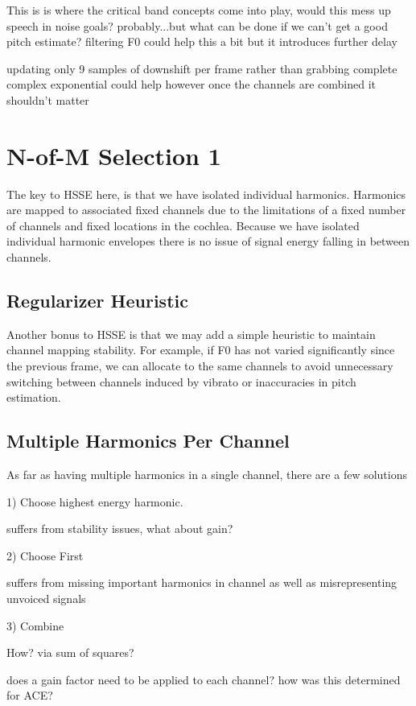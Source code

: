 \documentclass [11pt, proquest] {uwthesis}[2015/03/03]
\begin{document}
This is is where the critical band concepts come into play, would this mess up speech in noise goals? probably...but what can be done if we can't get a good pitch estimate?  filtering F0 could help this a bit but it introduces further delay

updating only 9 samples of downshift per frame rather than grabbing complete complex exponential could help however once the channels are combined it shouldn't matter

\section{N-of-M Selection 1}

The key to HSSE here, is that we have isolated individual harmonics.  Harmonics are mapped to associated fixed channels due to the limitations of a fixed number of channels and fixed locations in the cochlea.  Because we have isolated individual harmonic envelopes there is no issue of signal energy falling in between channels.

\subsection{Regularizer Heuristic}

Another bonus to HSSE is that we may add a simple heuristic to maintain channel mapping stability.  For example, if F0 has not varied significantly since the previous frame, we can allocate to the same channels to avoid unnecessary switching between channels induced by vibrato or inaccuracies in pitch estimation.

\subsection{Multiple Harmonics Per Channel}
As far as having multiple harmonics in a single channel, there are a few solutions

1) Choose highest energy harmonic.

suffers from stability issues, what about gain?

2) Choose First

suffers from missing important harmonics in channel as well as misrepresenting unvoiced signals

3) Combine

How?  via sum of squares?

does a gain factor need to be applied to each channel?  how was this determined for ACE?
\end{document}
